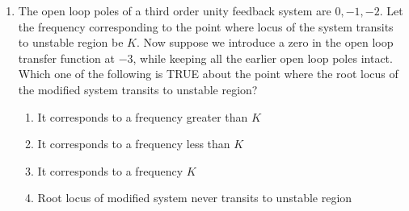 \documentclass[journal]{IEEEtran}
\begin{document}
\begin{enumerate}
    \item The open loop poles of a third order unity feedback system are $0, -1, -2$. Let the frequency corresponding to the point where locus of the system transits to unstable region be $K$. Now suppose we introduce a zero in the open loop transfer function at $-3$, while keeping all the earlier open loop poles intact. Which one of the following is TRUE about the point where the root locus of the modified system transits to unstable region?
        \begin{enumerate}
            \item It corresponds to a frequency greater than $K$
            \item It corresponds to a frequency less than $K$
            \item It corresponds to a frequency $K$
            \item Root locus of modified system never transits to unstable region
        \end{enumerate}


\end{enumerate}


  
\end{document}
